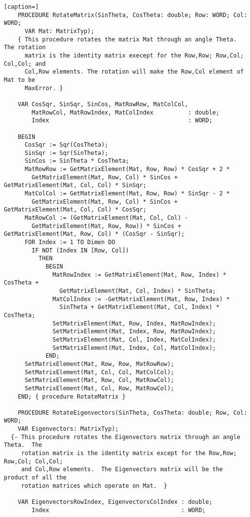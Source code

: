 \begin{lstlisting}[caption=]
    PROCEDURE RotateMatrix(SinTheta, CosTheta: double; Row: WORD; Col: WORD;
      VAR Mat: MatrixTyp);
    { This procedure rotates the matrix Mat through an angle Theta.  The rotation
      matrix is the identity matrix execept for the Row,Row; Row,Col; Col,Col; and
      Col,Row elements. The rotation will make the Row,Col element of Mat to be
      MaxError. }

    VAR CosSqr, SinSqr, SinCos, MatRowRow, MatColCol,
        MatRowCol, MatRowIndex, MatColIndex          : double;
        Index                                        : WORD;

    BEGIN
      CosSqr := Sqr(CosTheta);
      SinSqr := Sqr(SinTheta);
      SinCos := SinTheta * CosTheta;
      MatRowRow := GetMatrixElement(Mat, Row, Row) * CosSqr + 2 *
        GetMatrixElement(Mat, Row, Col) * SinCos + GetMatrixElement(Mat, Col, Col) * SinSqr;
      MatColCol := GetMatrixElement(Mat, Row, Row) * SinSqr - 2 *
        GetMatrixElement(Mat, Row, Col) * SinCos + GetMatrixElement(Mat, Col, Col) * CosSqr;
      MatRowCol := (GetMatrixElement(Mat, Col, Col) -
        GetMatrixElement(Mat, Row, Row)) * SinCos + GetMatrixElement(Mat, Row, Col) * (CosSqr - SinSqr);
      FOR Index := 1 TO Dimen DO
        IF NOT (Index IN [Row, Col])
          THEN
            BEGIN
              MatRowIndex := GetMatrixElement(Mat, Row, Index) * CosTheta +
                GetMatrixElement(Mat, Col, Index) * SinTheta;
              MatColIndex := -GetMatrixElement(Mat, Row, Index) *
                SinTheta + GetMatrixElement(Mat, Col, Index) * CosTheta;
              SetMatrixElement(Mat, Row, Index, MatRowIndex);
              SetMatrixElement(Mat, Index, Row, MatRowIndex);
              SetMatrixElement(Mat, Col, Index, MatColIndex);
              SetMatrixElement(Mat, Index, Col, MatColIndex);
            END;
      SetMatrixElement(Mat, Row, Row, MatRowRow);
      SetMatrixElement(Mat, Col, Col, MatColCol);
      SetMatrixElement(Mat, Row, Col, MatRowCol);
      SetMatrixElement(Mat, Col, Row, MatRowCol);
    END; { procedure RotateMatrix }

    PROCEDURE RotateEigenvectors(SinTheta, CosTheta: double; Row, Col: WORD;
    VAR Eigenvectors: MatrixTyp);
  {- This procedure rotates the Eigenvectors matrix through an angle Theta.  The
     rotation matrix is the identity matrix except for the Row,Row; Row,Col; Col,Col;
     and Col,Row elements.  The Eigenvectors matrix will be the product of all the
     rotation matrices which operate on Mat.  }

    VAR EigenvectorsRowIndex, EigenvectorsColIndex : double;
        Index                                      : WORD;


\end{lstlisting}
